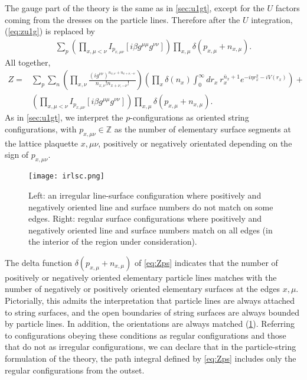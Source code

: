 \documentclass[12pt]{article}
\theoremstyle{definition}
\begin{document}
The gauge part of the theory is the same as in \cref{sec:u1gt}, except for the $U$ factors coming from  the dresses on the particle lines. Therefore after the $U$ integration, (\ref{eq:zu1g}) is replaced by
\begin{align}
\sum_{p} (\prod_{x,\mu<\nu} I_{p_{x,\mu\nu}}[i \beta g^{\mu\mu} g^{\nu\nu}]) \prod_{x,\mu} \delta(p_{x,\mu}+n_{x,\mu}).
\label{eq:zsu1g}
\end{align}
All together,
\begin{align}
Z=&\sum_{p} \sum_{n}(\prod_{x,\nu} \frac{(i g^{\nu\nu} )^{n_{x,\nu}+n_{x+\nu,-\nu}}}{n_{x,\nu}! n_{x+\nu,-\nu}!}) (\prod_{x} \delta(n_x) \int_0^\infty dr_x ~ r_x^{\bar{n}_x+1} e^{-i\eta r_x^2-iV(r_x)})+
\nonumber
\\&(\prod_{x,\mu<\nu} I_{p_{x,\mu\nu}}[i \beta g^{\mu\mu} g^{\nu\nu}]) \prod_{x,\mu} \delta(p_{x,\mu}+n_{x,\mu}).
\label{eq:Zps}
\end{align}
As in \cref{sec:u1gt}, we interpret the $p$-configurations as oriented string configurations, with $p_{x,\mu\nu}\in\mathbb{Z}$ as the number of elementary surface segments at the lattice plaquette $x,\mu\nu$, positively or negatively orientated depending on the sign of $p_{x,\mu\nu}$.

\begin{figure}%
    \centering
    \texttt{[image: irlsc.png]}
    \caption{Left: an irregular line-surface configuration where positively and negatively oriented line and surface numbers do not match on some edges. Right: regular surface configurations where positively and negatively oriented line and surface numbers match on all edges (in the interior of the region under consideration).}
    \label{fig:irlsc}
\end{figure} 

The delta function $\delta(p_{x,\mu}+n_{x,\mu})$ of \eqref{eq:Zps} indicates that the number of positively or negatively oriented elementary particle lines matches with the number of negatively or positively oriented elementary surfaces at the edges $x,\mu$. Pictorially, this admits the interpretation that particle lines are always attached to string surfaces, and the open boundaries of string surfaces are always bounded by particle lines. In addition, the orientations are always matched (\cref{fig:irlsc}). Referring to configurations obeying these conditions as regular configurations and those that do not as irregular configurations, we can declare that in the particle-string formulation of the theory, the path integral defined by \eqref{eq:Zps} includes only the regular configurations from the outset.
\end{document}
